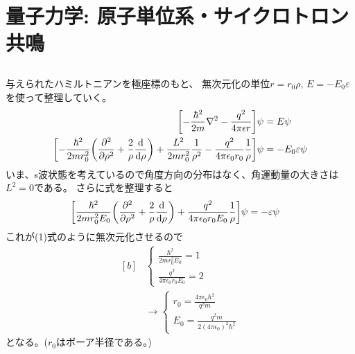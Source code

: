 \documentclass[../../master.tex]{subfiles}
\begin{document}
\section{量子力学: 原子単位系・サイクロトロン共鳴}
\subsection{}
与えられたハミルトニアンを極座標のもと、
無次元化の単位\(r=r_0 \rho,\,E=-E_0 \varepsilon\)を使って整理していく。
\begin{equation}\begin{aligned}[b]
    \qty[-\frac{\hbar^2}{2m}\laplacian - \frac{q^2}{4\pi\epsilon r}]\psi &= E\psi\\
    \qty[-\frac{\hbar^2}{2mr_0^2}\qty(\pdv[2]{\rho}
    + \frac{2}{\rho}\dv{\rho})+\frac{L^2}{2mr_0^2}\frac{1}{\rho^2}-\frac{q^2}{4\pi\epsilon_0 r_0}\frac{1}{\rho}]\psi
    &= -E_0 \varepsilon\psi
\end{aligned}\end{equation}
いま、s波状態を考えているので角度方向の分布はなく、角運動量の大きさは\(L^2=0\)である。
さらに式を整理すると
\begin{equation}\begin{aligned}[b]
    \qty[\frac{\hbar^2}{2mr_0^2E_0}\qty(\pdv[2]{\rho}
    + \frac{2}{\rho}\dv{\rho})+\frac{q^2}{4\pi\epsilon_0 r_0 E_0}\frac{1}{\rho}]\psi
    &= -\varepsilon\psi
\end{aligned}\end{equation}
これが(1)式のように無次元化させるので
\begin{equation}\begin{aligned}[b]
    &\begin{cases}
        \frac{\hbar^2}{2mr_0^2 E_0} = 1\\
        \frac{q^2}{4\pi\epsilon_0r_0 E_0} = 2
    \end{cases}\\
    &\rightarrow\begin{cases}
        r_0 = \frac{4\pi\epsilon_0\hbar^2}{q^2m}    \\
        E_0 = \frac{q^2m}{2(4\pi\epsilon_0)^2\hbar^2}
    \end{cases}
\end{aligned}\end{equation}
となる。(\(r_0\)はボーア半径である。)
\end{document}

